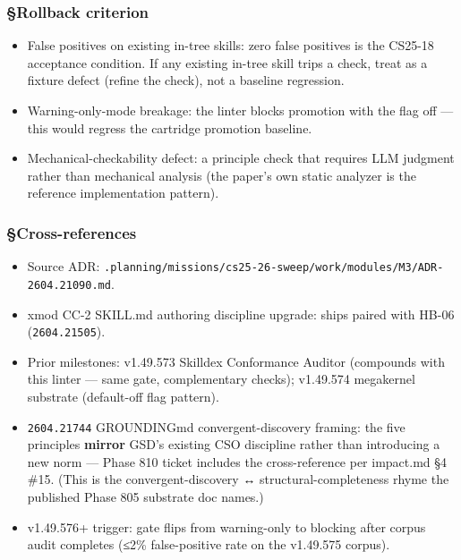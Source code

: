 \documentclass[11pt,letterpaper]{article}
\newcommand{\arxivid}[1]{\texttt{\textcolor{accent}{#1}}}
\providecommand{\tightlist}{\setlength{\itemsep}{0pt}\setlength{\parskip}{0pt}}
\begin{document}
\subsubsection{§Rollback criterion}

\begin{itemize}
\tightlist
\item
  False positives on existing in-tree skills: zero false positives is
  the CS25-18 acceptance condition. If any existing in-tree skill trips
  a check, treat as a fixture defect (refine the check), not a baseline
  regression.
\item
  Warning-only-mode breakage: the linter blocks promotion with the flag
  off --- this would regress the cartridge promotion baseline.
\item
  Mechanical-checkability defect: a principle check that requires LLM
  judgment rather than mechanical analysis (the paper's own static
  analyzer is the reference implementation pattern).
\end{itemize}

\subsubsection{§Cross-references}

\begin{itemize}
\tightlist
\item
  Source ADR:
  \texttt{.planning/missions/cs25-26-sweep/work/modules/M3/ADR-\arxivid{2604.21090}.md}.
\item
  xmod CC-2 SKILL.md authoring discipline upgrade: ships paired with
  HB-06 (\arxivid{2604.21505}).
\item
  Prior milestones: v1.49.573 Skilldex Conformance Auditor (compounds
  with this linter --- same gate, complementary checks); v1.49.574
  megakernel substrate (default-off flag pattern).
\item
  \arxivid{2604.21744} GROUNDINGmd convergent-discovery framing: the five
  principles \textbf{mirror} GSD's existing CSO discipline rather than
  introducing a new norm --- Phase 810 ticket includes the
  cross-reference per impact.md §4 \#15. (This is the
  convergent-discovery ↔ structural-completeness rhyme the published
  Phase 805 substrate doc names.)
\item
  v1.49.576+ trigger: gate flips from warning-only to blocking after
  corpus audit completes (≤2\% false-positive rate on the v1.49.575
  corpus).
\end{itemize}
\end{document}
